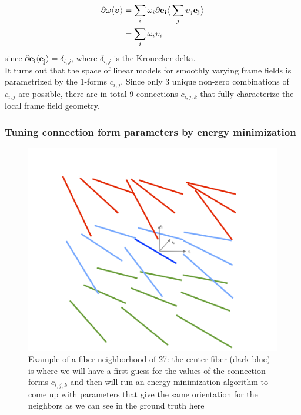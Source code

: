 \begin{equation}
\begin{split}
    \partial \omega \langle \boldsymbol{\upsilon} \rangle &= \sum_i{\omega_i \partial \mathbf{e_i}} \big{\langle} \sum_j{\upsilon_j \mathbf{e_j}} \big{\rangle} \\
    &= \sum_i{\omega_i \upsilon_i}
\end{split}
\end{equation} since $\partial \mathbf{e_i} \langle \mathbf{e_j} \rangle = \delta_{i,j}$, where $\delta_{i,j}$ is the Kronecker delta. \\
It turns out that the space of linear models for smoothly varying frame fields is parametrized by the 1-forms $c_{i,j}$. Since only 3 unique non-zero combinations of $c_{i,j}$ are possible, there are in total 9 connections $c_{i,j,k}$ that fully characterize the local frame field geometry.\\

\subsubsection{Tuning connection form parameters by energy minimization}

\begin{figure}[h!]
    \centering
    \includegraphics[width=.5\textwidth]{figures/fibers_neighborhood3d}
    \caption{Example of a fiber neighborhood of 27: the center fiber (dark blue) is where we will have a first guess for the values of the connection forms $c_{i,j,k}$ and then will run an energy minimization algorithm to come up with parameters that give the same orientation for the neighbors as we can see in the ground truth here}
    \label{fig:fibers_neighborhood3d}
\end{figure}

